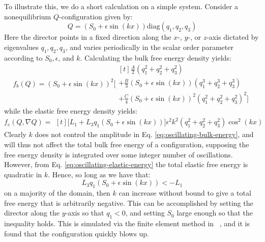 \documentclass[reqno]{article}
\begin{document}
  To illustrate this, we do a short calculation on a simple system.
  Consider a nonequilibrium $Q$-configuration given by:
  \begin{equation}
    Q
    =
    \left( S_0 + \epsilon \sin(kx) \right)
    \text{diag}(q_1, q_2, q_3)
  \end{equation}
  Here the director points in a fixed direction along the $x$-, $y$-, or
  $z$-axis dictated by eigenvalues $q_1, q_2,
  q_3$, and varies periodically in the scalar order parameter according to $S_0, \epsilon$,
  and $k$.
  Calculating the bulk free energy density yields:
  \begin{equation}\label{eq:oscillating-bulk-energy}
    f_b(Q)
    =
    \left(S_{0} + \epsilon \sin{\left(k x \right)}\right)^{2}
    \bigl[
    \begin{multlined}[t]
      \tfrac{A}{2} \left(q_{1}^{2} + q_{2}^{2} + q_{3}^{2}\right) \\
      + \tfrac{B}{3} \left(S_{0} + \epsilon \sin{\left(k x \right)}\right) \left(q_{1}^{3} + q_{2}^{3} + q_{3}^{3}\right) \\
      + \tfrac{C}{4} \left(S_{0} + \epsilon \sin{\left(k x \right)}\right)^{2} \left(q_{1}^{2} + q_{2}^{2} + q_{3}^{2}\right)^{2}
      \bigr]
    \end{multlined}
  \end{equation}
  while the elastic free energy density yields:
  \begin{equation} \label{eq:oscillating-elastic-energy}
    f_e(Q, \nabla Q)
    =
    \begin{multlined}[t]
      \bigl[
      L_{1}
      + L_{3} q_{1} \left(S_{0} + \epsilon \sin{\left(k x \right)}\right)
      \bigr]
      \epsilon^{2} k^{2}
      \left(q_{1}^{2} + q_{2}^{2} + q_{3}^{2}\right)
      \cos^{2}{\left(k x \right)}
    \end{multlined}
  \end{equation}
  Clearly $k$ does not control the amplitude in Eq.
  \eqref{eq:oscillating-bulk-energy}, and will thus not affect the total bulk free
  energy of a configuration, supposing the free energy density is integrated
  over some integer number of oscillations.
  However, from Eq. \eqref{eq:oscillating-elastic-energy} the total elastic free
  energy is quadratic in $k$.
  Hence, so long as we have that:
  \begin{equation}
    L_3 q_1(S_0 + \epsilon \sin(kx)) < -L_1
  \end{equation}
  on a majority of the domain, then $k$ can increase without bound to give a
  total free energy that is arbitrarily negative.
  This can be accomplished by setting the director along the $y$-axis so that
  $q_1 < 0$, and setting $S_0$ large enough so that the inequality holds.
  This is simulated via the finite element method in
  ~\cite{schimming_numerical_2021}, and it is found that the configuration
  quickly blows up.
\end{document}
